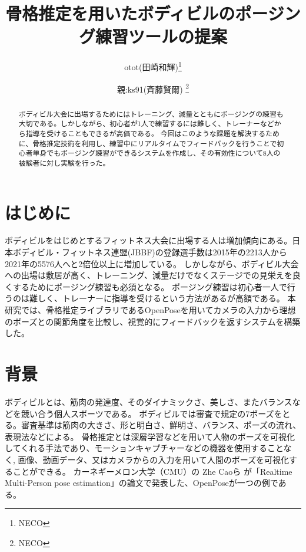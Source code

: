 \documentclass[a4j,10pt]{jsarticle}
\begin{document}

\title{骨格推定を用いたボディビルのポージング練習ツールの提案}

\author{
    otot(田崎和輝)\thanks{NECO}
    \and
    親:ks91(斉藤賢爾) \thanks{NECO}
}

\begin{abstract}
ボディビル大会に出場するためにはトレーニング、減量とともにポージングの練習も大切である。しかしながら、初心者が1人で練習するには難しく、トレーナーなどから指導を受けることもできるが高価である。
今回はこのような課題を解決するために、骨格推定技術を利用し、練習中にリアルタイムでフィードバックを行うことで初心者単身でもポージング練習ができるシステムを作成し、その有効性について8人の被験者に対し実験を行った。

\end{abstract}

\maketitle

\section{はじめに}
ボディビルをはじめとするフィットネス大会に出場する人は増加傾向にある。日本ボディビル・フィットネス連盟(JBBF)の登録選手数は2015年の2213人から2021年の5576人へと2倍位以上に増加している\cite{jbbf}。
しかしながら、ボディビル大会への出場は敷居が高く、トレーニング、減量だけでなくステージでの見栄えを良くするためにポージング練習も必須となる。
ポージング練習は初心者一人で行うのは難しく、トレーナーに指導を受けるという方法があるが高額である。
本研究では、骨格推定ライブラリであるOpenPoseを用いてカメラの入力から理想のポーズとの関節角度を比較し、視覚的にフィードバックを返すシステムを構築した。
\section{背景}
ボディビルとは、筋肉の発達度、そのダイナミックさ、美しさ、またバランスなどを競い合う個人スポーツである。\cite{bodybuilding}
ボディビルでは審査で規定の7ポーズをとる。審査基準は筋肉の大きさ、形と明白さ、鮮明さ、バランス、ポーズの流れ、表現法などによる。
骨格推定とは深層学習などを用いて人物のポーズを可視化してくれる手法であり、モーションキャプチャーなどの機器を使用することなく,
画像、動画データ、又はカメラからの入力を用いて人間のポーズを可視化することができる。
カーネギーメロン大学（CMU）の Zhe Caoら が「Realtime Multi-Person pose estimation」\cite{openpose}の論文で発表した、OpenPoseが一つの例である。
\end{document}
